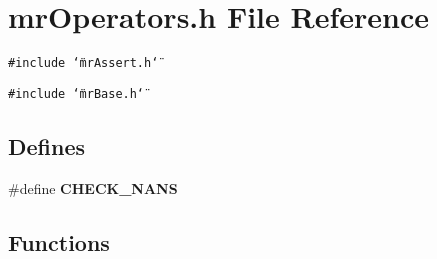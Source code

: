 \section{mr\-Operators.h File Reference}
\label{mrOperators_8h}
{\tt \#include \char`\"{}mr\-Assert.h\char`\"{}}\par
{\tt \#include \char`\"{}mr\-Base.h\char`\"{}}\par
\subsection*{Defines}
\begin{CompactItemize}
\item 
\#define {\bf CHECK\_\-NANS}
\end{CompactItemize}
\subsection*{Functions}
